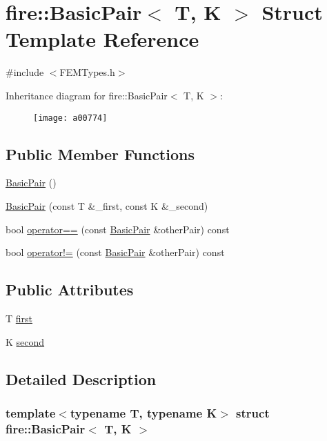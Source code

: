 \hypertarget{a00774}{}\section{fire\+:\+:Basic\+Pair$<$ T, K $>$ Struct Template Reference}
\label{a00774}


{\ttfamily \#include $<$F\+E\+M\+Types.\+h$>$}

Inheritance diagram for fire\+:\+:Basic\+Pair$<$ T, K $>$\+:\begin{figure}[H]
\begin{center}
\leavevmode
\texttt{[image: a00774]}
\end{center}
\end{figure}
\subsection*{Public Member Functions}
\begin{DoxyCompactItemize}
\item 
\hyperlink{a00774_a28eae46234d49126ac4727e7883174a4}{Basic\+Pair} ()
\item 
\hyperlink{a00774_ada8fa3f47bae245613d050598ac8488c}{Basic\+Pair} (const T \&\+\_\+first, const K \&\+\_\+second)
\item 
bool \hyperlink{a00774_acf9bd93b4bf7e16ca730a4dcc3ab859d}{operator==} (const \hyperlink{a00774}{Basic\+Pair} \&other\+Pair) const
\item 
bool \hyperlink{a00774_a8cff50c2cbaaa51cba83832d435455d7}{operator!=} (const \hyperlink{a00774}{Basic\+Pair} \&other\+Pair) const
\end{DoxyCompactItemize}
\subsection*{Public Attributes}
\begin{DoxyCompactItemize}
\item 
T \hyperlink{a00774_a4e073a19bf2d3330d105d81a8febc4be}{first}
\item 
K \hyperlink{a00774_aecd2977e2fb903a5b106e4b5d7ab3bac}{second}
\end{DoxyCompactItemize}


\subsection{Detailed Description}
\subsubsection*{template$<$typename T, typename K$>$\newline
struct fire\+::\+Basic\+Pair$<$ T, K $>$}

